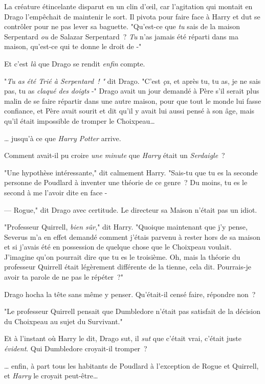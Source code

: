 La créature étincelante disparut en un clin d'œil, car l'agitation qui montait en Drago l'empêchait de maintenir le sort. Il pivota pour faire face à Harry et dut se contrôler pour ne pas lever sa baguette. "Qu'est-ce que \emph{tu} sais de la maison Serpentard \emph{ou} de Salazar Serpentard~? \emph{Tu} n'as jamais été réparti dans ma maison, qu'est-ce qui te donne le droit de -"

Et c'est \emph{là} que Drago se rendit \emph{enfin} compte.

"\emph{Tu as été Trié à Serpentard~! "} dit Drago. "C'est \emph{ça}, et après tu, tu as, je ne sais pas, tu as \emph{claqué des doigts} -" Drago avait un jour demandé à Père s'il serait plus malin de se faire répartir dans une autre maison, pour que tout le monde lui fasse confiance, et Père avait sourit et dit qu'il y avait lui aussi pensé à son âge, mais qu'il était impossible de tromper le Choixpeau…

… jusqu'à ce que \emph{Harry Potter} arrive.

Comment avait-il pu croire \emph{une minute} que \emph{Harry} était un \emph{Serdaigle}~?

"Une hypothèse intéressante," dit calmement Harry. "Sais-tu que tu es la seconde personne de Poudlard à inventer une théorie de ce genre~? Du moins, tu es le second à me l'avoir dite en face -

--- Rogue," dit Drago avec certitude. Le directeur sa Maison n'était pas un idiot.

"Professeur Quirrell, \emph{bien sûr}," dit Harry. "Quoique maintenant que j'y pense, Severus m'a en effet demandé comment j'étais parvenu à rester hors de sa maison et si j'avais été en possession de quelque chose que le Choixpeau voulait. J'imagine qu'on pourrait dire que tu es le troisième. Oh, mais la théorie du professeur Quirrell était légèrement différente de la tienne, cela dit. Pourrais-je avoir ta parole de ne pas le répéter~?"

Drago hocha la tête sans même y penser. Qu'était-il censé faire, répondre non~?

"Le professeur Quirrell pensait que Dumbledore n'était pas satisfait de la décision du Choixpeau au sujet du Survivant."

Et à l'instant où Harry le dit, Drago sut, il \emph{sut} que c'était vrai, c'était juste \emph{évident}. Qui Dumbledore croyait-il tromper~?

… enfin, à part tous les habitants de Poudlard à l'exception de Rogue et Quirrell, et \emph{Harry} le croyait peut-être…


